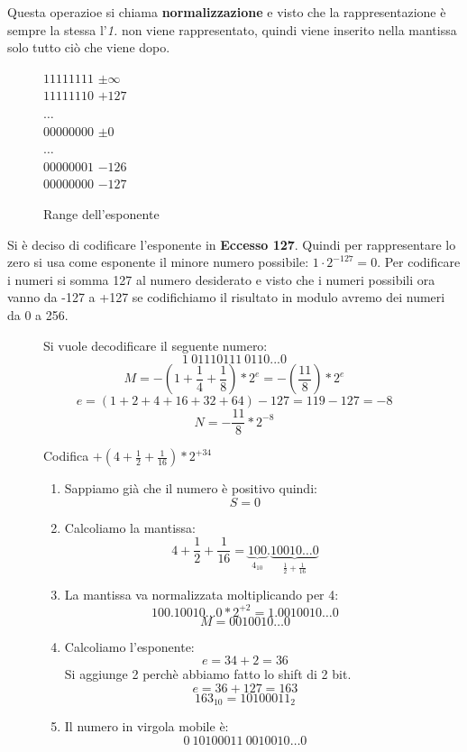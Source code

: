 \documentclass[a4paper]{article}
\theoremstyle{break}
\theoremstyle{break}
\theoremstyle{break}
\theoremstyle{break}
\begin{document}
Questa operazioe si chiama \textbf{normalizzazione} e visto che la
rappresentazione è sempre la stessa l'\emph{1.} non viene rappresentato, quindi
viene inserito nella mantissa solo tutto ciò che viene dopo.
\begin{figure}[H]
	\begin{center}
		\( 11111111 \) \( \pm \infty \)\\
		\( 11111110 \) \( +127 \) \\
		\( \ldots \)\\
		\( 00000000 \) \( \pm 0 \)\\
		\( \ldots \)\\
		\( 00000001 \) \( -126 \) \\
		\( 00000000 \) \( -127 \)
	\end{center}
	\caption{Range dell'esponente}
\end{figure}
Si è deciso di codificare l'esponente in \textbf{Eccesso 127}. Quindi per
rappresentare lo zero si usa come esponente il minore numero possibile:
$1 \cdot 2^{-127} = 0$. Per codificare i numeri si somma 127 al numero desiderato
e visto che i numeri possibili ora vanno da -127 a +127 se codifichiamo
il risultato in modulo avremo dei numeri da 0 a 256.

\begin{figure}[H]
	\begin{example}
		Si vuole decodificare il seguente numero:
		\[1\:01110111\:0110...0\]
		\[M = -(1+\frac{1}{4}+\frac{1}{8})*2^e = -(\frac{11}{8})*2^{e}\]
		\[e = (1+2+4+16+32+64)-127=119-127=-8\]
		\[N = -\frac{11}{8} * 2^{-8}\]
	\end{example}
\end{figure}

\begin{figure}[H]
	\begin{example}
		Codifica $+(4+\frac{1}{2}+\frac{1}{16})*2^{+34}$
		\begin{enumerate}
			\item Sappiamo già che il numero è positivo quindi:
			      \[
				      S=0
			      \]
			\item Calcoliamo la mantissa:
			      \[
				      4+\frac{1}{2}+\frac{1}{16}= \underbrace{100}_{4_{10}}.
				      \underbrace{10010 \ldots 0}_{\frac{1}{2}+\frac{1}{16}}
			      \]
			\item La mantissa va normalizzata moltiplicando per 4:
			      \[
				      100.10010 \ldots 0 * 2^{+2} = 1.0010010 \ldots 0
			      \]
			      \[
				      M = 0010010 \ldots 0
			      \]
			\item Calcoliamo l'esponente:
                \[
                e = 34 + 2 = 36
                \] Si aggiunge 2 perchè abbiamo fatto lo shift di 2 bit.
                \[
                e = 36 + 127 = 163
                \] 
                \[
                    163_{10} = 10100011_2
                \] 
                \item Il numero in virgola mobile è:
                \[
                    0\:10100011\:0010010 \ldots 0
                \]
		\end{enumerate}
	\end{example}
\end{figure}
\end{document}
